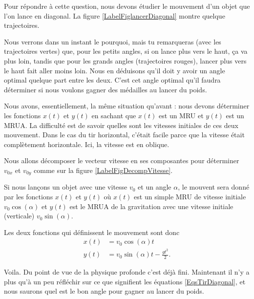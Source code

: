 \documentclass[a4paper,12pt]{book}
\theoremstyle{mes_exemples}	\newtheorem{exemple}[numtho]{Exemple}
\theoremstyle{mes_tho}
\begin{document}
Pour répondre à cette question, nous devons étudier le mouvement d'un objet que l'on lance en diagonal. La figure \ref{LabelFiglancerDiagonal} montre quelque trajectoires.
\newcommand{\CaptionFiglancerDiagonal}{La trajectoire de quelque mobiles lancés en diagonal.}

Nous verrons dans un instant le pourquoi, mais tu remarqueras (avec les trajectoires vertes) que, pour les petits angles, si on lance plus vers le haut, ça va plus loin, tandis que pour les grands angles (trajectoires rouges), lancer plus vers le haut fait aller moins loin. Nous en déduisons qu'il doit y avoir un angle optimal quelque part entre les deux. C'est cet angle optimal qu'il faudra déterminer si nous voulons gagner des médailles au lancer du poids.

Nous avons, essentiellement, la même situation qu'avant : nous devons déterminer les fonctions $x(t)$ et $y(t)$ en sachant que $x(t)$ est un MRU et $y(t)$ est un MRUA. La difficulté est de savoir quelles sont les vitesses initiales de ces deux mouvement. Dans le cas du tir horizontal, c'était facile parce que la vitesse était complètement horizontale. Ici, la vitesse est en oblique.

\newcommand{\CaptionFigDecompVitesse}{Tir oblique à différents angles. Un tout petit peu de trigonométrie nous donne les composantes de la vitesse initiale selon les deux axes.}


\begin{idee}
	Nous allons décomposer le vecteur vitesse en ses composantes pour déterminer $v_{0x}$ et $v_{0y}$ comme sur la figure \ref{LabelFigDecompVitesse}.
\end{idee}

Si nous lançons un objet avec une vitesse $v_0$ et un angle $\alpha$, le mouvent sera donné par les fonctions $x(t)$ et $y(t)$ où $x(t)$ est un simple MRU de vitesse initiale $v_0\cos(\alpha)$ et $y(t)$ est le MRUA de la gravitation avec une vitesse initiale (verticale) $v_0\sin(\alpha)$.

Les deux fonctions qui définissent le mouvement sont donc
\begin{subequations}		\label{EqsTirDiagonal}
	\begin{align}
		x(t)&=v_0\cos(\alpha) t\\
		y(t)&=v_0\sin(\alpha) t -\frac{ gt^2 }{ 2 }.
	\end{align}
\end{subequations}

Voila. Du point de vue de la physique profonde c'est déjà fini. Maintenant il n'y a plus qu'à un peu réfléchir sur ce que signifient les équations \eqref{EqsTirDiagonal}, et nous saurons quel est le bon angle pour gagner au lancer du poids. 
\end{document}
